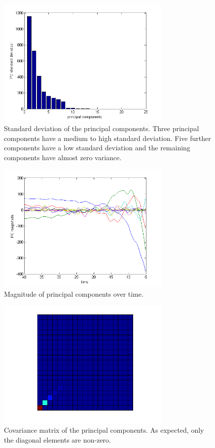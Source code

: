 \documentclass{scrartcl}
\begin{document}
\begin{figure}[h]
\centering
\includegraphics[trim = {0.55cm 0.3cm 1cm 0.7cm}, width=0.75\textwidth, clip]{../pics/pc_magn}
\caption{Standard deviation of the principal components. Three principal components have a medium to high standard deviation. Five further components have a low standard deviation and the remaining components have almost zero variance.}
\label{}
\end{figure}

\begin{figure}[h]
\centering
\includegraphics[trim = {0.6cm 0.3cm 1cm 0.7cm}, width=0.75\textwidth, clip]{../pics/pc_time}
\caption{Magnitude of principal components over time.}
\label{}
\end{figure}

\begin{figure}[h]
\centering
\includegraphics[trim = {1.7cm 0.5cm 1cm 1.7cm}, width=0.75\textwidth, clip]{../pics/pc_cov}
\caption{Covariance matrix of the principal components. As expected, only the diagonal elements are non-zero.}
\label{}
\end{figure}
\end{document}
